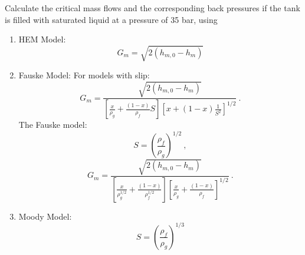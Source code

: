 \documentclass[12pt]{article}
\begin{document}
Calculate the critical mass flows and the corresponding back pressures if the tank is filled with saturated liquid at a pressure of 35 bar, using
% 
\begin{enumerate}
    \item HEM Model:
    \begin{equation}
        G_m = \sqrt{2 \left( h_{m,0} - h_m \right)}
    \end{equation}
    
    
    
    \clearpage
    \item Fauske Model:
    For models with slip:
    \begin{equation}
        G_m = \frac{\sqrt{2 \left( h_{m,0} - h_m \right)}}{\left[ \frac{x}{\rho_g} + \frac{\left( 1-x \right)}{\rho_f} S \right] \left[ x + \left( 1-x \right)\frac{1}{S^2} \right]^{1/2}}\:.
    \end{equation}
    The Fauske model:
    \begin{equation}
        S = \left( \frac{\rho_f}{\rho_g} \right)^{1/2}\:,
    \end{equation}
    \begin{equation}
        G_m = \frac{\sqrt{2 \left( h_{m,0} - h_m \right)}}{\left[ \frac{x}{\rho_g^{1/2}} + \frac{\left( 1-x \right)}{\rho_f^{1/2}} \right] \left[ \frac{x}{\rho_g} + \frac{\left( 1-x \right)}{\rho_f} \right]^{1/2}}\:.
    \end{equation}
    
    
    
    \clearpage
    \item Moody Model:
    \begin{equation}
        S = \left( \frac{\rho_f}{\rho_g} \right)^{1/3}
    \end{equation}
    



\end{enumerate}
\end{document}
